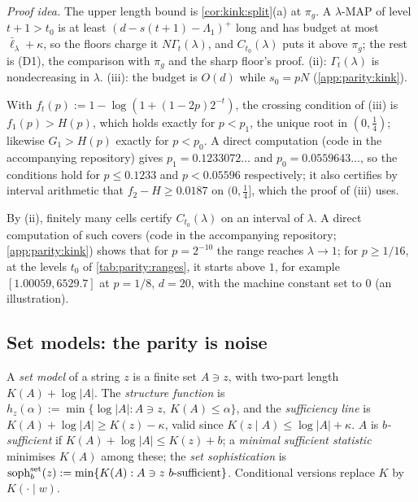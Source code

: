 \emph{Proof idea.} The upper length bound is \cref{cor:kink:split}(a) at $\pi_g$. A $\lambda$-MAP of level $t+1>t_0$ is at least $(d-s(t+1)-\Lambda_1)^+$ long and has budget at most $\bar\ell_\lambda+\kappa$, so the floors charge it $N\Gamma_t(\lambda)$, and $C_{t_0}(\lambda)$ puts it above $\pi_g$; the rest is (D1), the comparison with $\pi_g$ and the sharp floor's proof. (ii): $\Gamma_t(\lambda)$ is nondecreasing in $\lambda$. (iii): the budget is $O(d)$ while $s_0=pN$ (\cref{app:parity:kink}).

With $f_t(p):=1-\log(1+(1-2p)2^{-t})$, the crossing condition of (iii) is $f_1(p)>H(p)$, which holds exactly for $p<p_1$, the unique root in $(0,\frac14)$; likewise $G_1>H(p)$ exactly for $p<p_0$. A direct computation (code in the accompanying repository) gives $p_1=0.1233072\ldots$ and $p_0=0.0559643\ldots$, so the conditions hold for $p\le0.1233$ and $p<0.05596$ respectively; it also certifies by interval arithmetic that $f_2-H\ge0.0187$ on $(0,\frac14]$, which the proof of (iii) uses.

By (ii), finitely many cells certify $C_{t_0}(\lambda)$ on an interval of $\lambda$. A direct computation of such covers (code in the accompanying repository; \cref{app:parity:kink}) shows that for $p=2^{-10}$ the range reaches $\lambda\to1$; for $p\ge1/16$, at the levels $t_0$ of \cref{tab:parity:ranges}, it starts above $1$, for example $[1.00059,6529.7]$ at $p=1/8$, $d=20$, with the machine constant set to $0$ (an illustration).

\subsection{Set models: the parity is noise}\label{sec:algstat:set}

\begin{definition}\label{def:algstat:set}
A \emph{set model} of a string $z$ is a finite set $A\ni z$, with two-part length $K(A)+\log|A|$. The \emph{structure function} is $h_z(\alpha):=\min\{\log|A|:A\ni z,\ K(A)\le\alpha\}$, and the \emph{sufficiency line} is $K(A)+\log|A|\ge K(z)-\kappa$, valid since $K(z\mid A)\le\log|A|+\kappa$. $A$ is \emph{$b$-sufficient} if $K(A)+\log|A|\le K(z)+b$; a \emph{minimal sufficient statistic} minimises $K(A)$ among these; the \emph{set sophistication} is $\sophset_b(z):=\min\{K(A):A\ni z\ \text{$b$-sufficient}\}$. Conditional versions replace $K$ by $K(\cdot\mid w)$.
\end{definition}


